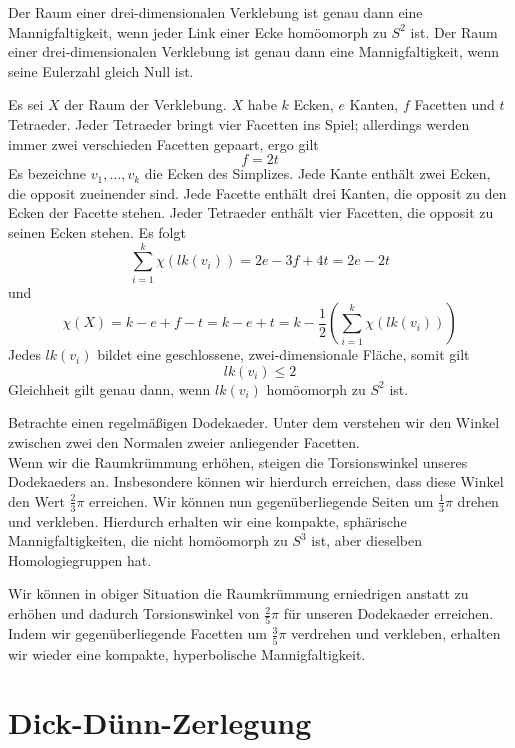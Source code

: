 \documentclass{book}
\begin{document}
\Prop{}
Der Raum einer drei-dimensionalen Verklebung ist genau dann eine Mannigfaltigkeit, wenn jeder Link einer Ecke homöomorph zu $S^2$ ist.
\Prop{}
Der Raum einer drei-dimensionalen Verklebung ist genau dann eine Mannigfaltigkeit, wenn seine Eulerzahl gleich Null ist.
\begin{Beweis}{}
	Es sei $X$ der Raum der Verklebung. $X$ habe $k$ Ecken, $e$ Kanten, $f$ Facetten und $t$ Tetraeder. Jeder Tetraeder bringt vier Facetten ins Spiel; allerdings werden immer zwei verschieden Facetten gepaart, ergo gilt
	\[ f = 2t \]
	Es bezeichne $v_1,\ldots, v_k$ die Ecken des Simplizes. Jede Kante enthält zwei Ecken, die opposit zueinender sind. Jede Facette enthält drei Kanten, die opposit zu den Ecken der Facette stehen. Jeder Tetraeder enthält vier Facetten, die opposit zu seinen Ecken stehen. Es folgt
	\[ \sum_{i=1}^k \chi(lk(v_i)) = 2e - 3f + 4t = 2e - 2t \]
	und
	\[ \chi(X) = k - e+f-t = k -e + t = k - \frac{1}{2}(\sum_{i=1}^k \chi(lk(v_i))) \]
	Jedes $lk(v_i)$ bildet eine geschlossene, zwei-dimensionale Fläche, somit gilt
	\[ lk(v_i) \leq 2 \]
	Gleichheit gilt genau dann, wenn $lk(v_i)$ homöomorph zu $S^2$ ist.
\end{Beweis}

Betrachte einen regelmäßigen Dodekaeder. Unter dem  verstehen wir den Winkel zwischen zwei den Normalen zweier anliegender Facetten.\\
Wenn wir die Raumkrümmung erhöhen, steigen die Torsionswinkel unseres Dodekaeders an. Insbesondere können wir hierdurch erreichen, dass diese Winkel den Wert $\frac{2}{3}\pi$ erreichen. Wir können nun gegenüberliegende Seiten um $\frac{1}{3}\pi$ drehen und verkleben. Hierdurch erhalten wir eine kompakte, sphärische Mannigfaltigkeiten, die nicht homöomorph zu $S^3$ ist, aber dieselben Homologiegruppen hat.

Wir können in obiger Situation die Raumkrümmung erniedrigen anstatt zu erhöhen und dadurch Torsionswinkel von $\frac{2}{5} \pi$ für unseren Dodekaeder erreichen. Indem wir gegenüberliegende Facetten um $\frac{3}{5}\pi$ verdrehen und verkleben, erhalten wir wieder eine kompakte, hyperbolische Mannigfaltigkeit.

\chapter{Dick-Dünn-Zerlegung}
\end{document}
